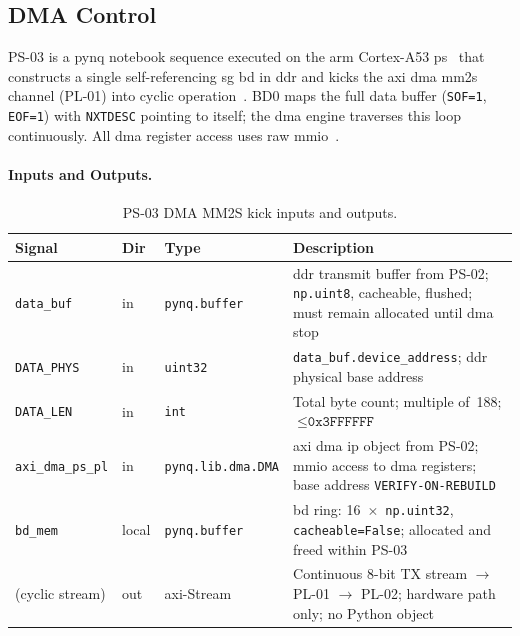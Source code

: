 \subsection{DMA Control}
\label{subsec:ps_dma_control}


PS-03 is a \ac{pynq} notebook sequence executed on the \ac{arm}
Cortex-A53 \ac{ps}~\cite{PYNQ_DOC} that constructs a single
self-referencing \ac{sg} \ac{bd} in \ac{ddr} and kicks the
\ac{axi} \ac{dma} \ac{mm2s} channel (PL-01) into cyclic
operation~\cite{AMD_PG021}.
BD0 maps the full data buffer (\texttt{SOF=1}, \texttt{EOF=1})
with \texttt{NXTDESC} pointing to itself; the \ac{dma} engine
traverses this loop continuously.
All \ac{dma} register access uses raw \ac{mmio}~\cite{AMD_PG021}.


\FloatBarrier
\paragraph{Inputs and Outputs.}
\leavevmode\par

\begin{table}[!h]
  \caption{PS-03 DMA MM2S kick inputs and outputs.}
  \label{tab:ps03_signals}
  \centering
  \small
  \begin{tabular}{l l p{3.2cm} p{6.6cm}}
    \hline
    Signal & Dir & Type & Description \\
    \hline
    \texttt{data\_buf}
      & in & \texttt{pynq.buffer}
      & \ac{ddr} transmit buffer from PS-02;
        \texttt{np.uint8}, cacheable, flushed;
        must remain allocated until \ac{dma} stop \\[2pt]
    \texttt{DATA\_PHYS}
      & in & \texttt{uint32}
      & \texttt{data\_buf.device\_address};
        \ac{ddr} physical base address \\[2pt]
    \texttt{DATA\_LEN}
      & in & \texttt{int}
      & Total byte count; multiple of~188;
        $\leq \texttt{0x3FFFFFF}$ \\[2pt]
    \texttt{axi\_dma\_ps\_pl}
      & in & \texttt{pynq.lib.dma.DMA}
      & \ac{axi} \ac{dma} \ac{ip} object from PS-02;
        \ac{mmio} access to \ac{dma} registers;
        base address \texttt{VERIFY-ON-REBUILD} \\[2pt]
    \texttt{bd\_mem}
      & local & \texttt{pynq.buffer}
      & \ac{bd} ring: 16~$\times$~\texttt{np.uint32},
        \texttt{cacheable=False};
        allocated and freed within PS-03 \\[2pt]
    (cyclic stream)
      & out & \ac{axi}-Stream
      & Continuous 8-bit TX stream $\rightarrow$ PL-01
        $\rightarrow$ PL-02; hardware path only;
        no Python object \\
    \hline
  \end{tabular}
\end{table}

